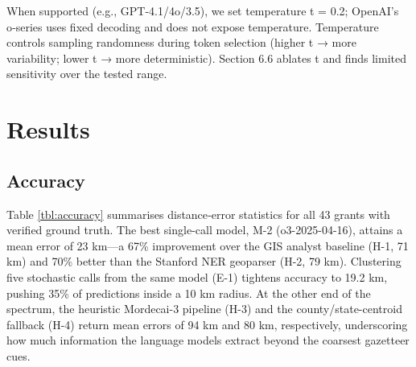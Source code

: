 When supported (e.g., GPT‑4.1/4o/3.5), we set temperature t = 0.2;
OpenAI's o‑series uses fixed decoding and does not expose temperature.
Temperature controls sampling randomness during token selection (higher
t → more variability; lower t → more deterministic). Section 6.6 ablates
t and finds limited sensitivity over the tested range.

\section{Results}\label{results}

\subsection{Accuracy}\label{accuracy}

Table \ref{tbl:accuracy} summarises distance‐error statistics for all 43
grants with verified ground truth. The best single-call model, M-2
(o3-2025-04-16), attains a mean error of 23 km---a 67\% improvement over
the GIS analyst baseline (H-1, 71 km) and 70\% better than the Stanford
NER geoparser (H-2, 79 km). Clustering five stochastic calls from the
same model (E-1) tightens accuracy to 19.2 km, pushing 35\% of
predictions inside a 10 km radius. At the other end of the spectrum, the
heuristic Mordecai-3 pipeline (H-3) and the county/state-centroid
fallback (H-4) return mean errors of 94 km and 80 km, respectively,
underscoring how much information the language models extract beyond the
coarsest gazetteer cues.

